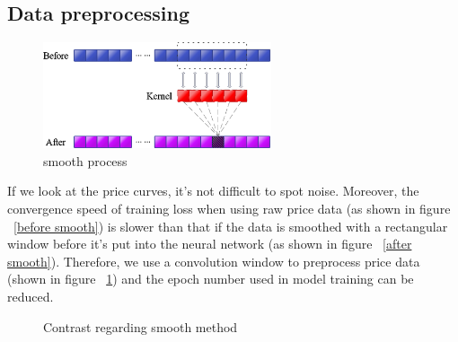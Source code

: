 \documentclass{mcmthesis}
\begin{document}
\subsection{ Data preprocessing}\label{data preprocessing}

\begin{figure}[htb]
    \centering
    \includegraphics[width = 0.6\textwidth]{fig/smooth process.png}  
    \caption{smooth process}
    \label{fig:smooth process}
\end{figure}

If we look at the price curves, it's not difficult to spot noise. Moreover, the convergence speed of training loss when using raw price data (as shown in figure ~\ref{before smooth}) is slower than that if the data is smoothed with a rectangular window before it's put into the neural network (as shown in figure ~\ref{after smooth}). Therefore, we use a convolution window to preprocess price data (shown in figure ~\ref{fig:smooth process}) and the epoch number used in model training can be reduced.

\begin{figure}[htb]
\centering
{}
\caption{Contrast regarding smooth method}
\label{fig:smooth}
\end{figure}
\end{document}
